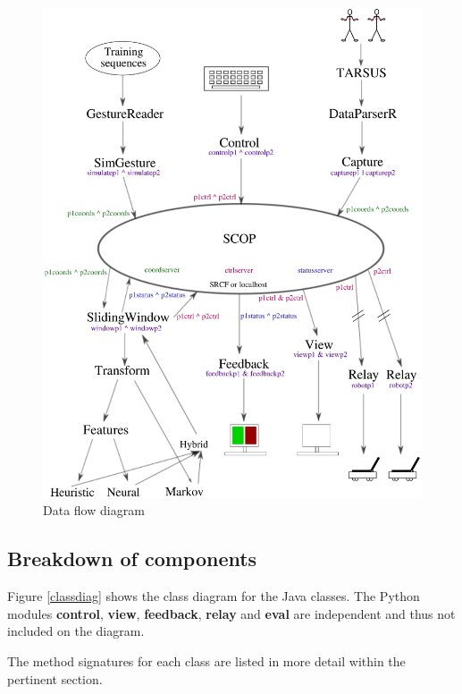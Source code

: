 \documentclass[12pt,a4,notitlepage]{report}
\renewcommand{\_}{\texttt{\symbol{95}}}
\newcommand{\<}{\texttt{\symbol{60}}}
\renewcommand{\>}{\texttt{\symbol{62}}}
\newcommand{\class}[1]{\textbf{#1}}
\begin{document}
\begin{figure}
\centering
\includegraphics[scale=0.75,angle=0]{diagrams/dataflowdiagram.ps}
\caption{Data flow diagram}
\label{dfd}
\end{figure}

\subsection{Breakdown of components}

Figure \ref{classdiag} shows the class diagram for the Java classes. The Python modules \class{control}, \class{view},
\class{feedback}, \class{relay} and \class{eval} are independent and thus not included on the diagram.

The method signatures for each class are listed in more detail within the pertinent section.
\end{document}
